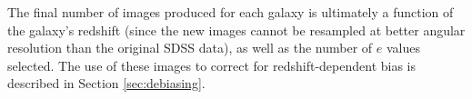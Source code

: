 \documentclass[twocolumn]{aastex6}
\begin{document}
The final number of \ferengi{} images produced for each galaxy is ultimately a
function of the galaxy's redshift (since the new images cannot be resampled at
better angular resolution than the original SDSS data), as well as the number
of $e$ values selected. The use of these images to correct for redshift-dependent
bias is described in Section \ref{sec:debiasing}.

\end{document}
